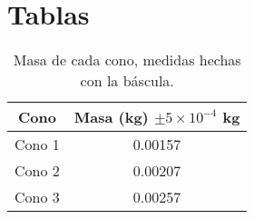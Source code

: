 \section{Tablas}

\begin{table}
    \centering
    \begin{tabular}{|c|c|}
        \hline
        \rowcolor{azulito} Cono & Masa (kg) $\pm 5\times10^{-4}$ kg \\
        \hline Cono 1 & 0.00157 \\
        \hline Cono 2 & 0.00207 \\
        \hline Cono 3 & 0.00257 \\
        \hline
    \end{tabular}
    \caption{Masa de cada cono, medidas hechas con la
    báscula.}
    \label{tab:masa_cono}
\end{table}

